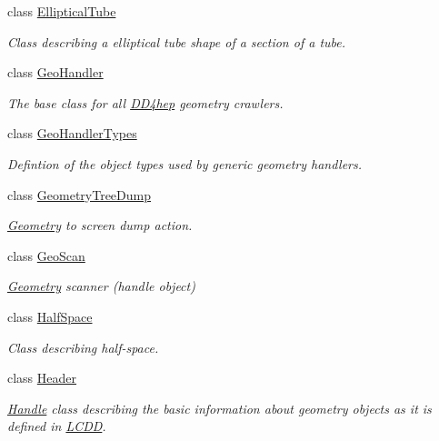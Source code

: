 \begin{DoxyCompactItemize}
class \hyperlink{class_d_d4hep_1_1_geometry_1_1_elliptical_tube}{Elliptical\+Tube}
\begin{DoxyCompactList}\small\item\em Class describing a elliptical tube shape of a section of a tube. \end{DoxyCompactList}\item 
class \hyperlink{class_d_d4hep_1_1_geometry_1_1_geo_handler}{Geo\+Handler}
\begin{DoxyCompactList}\small\item\em The base class for all \hyperlink{namespace_d_d4hep}{D\+D4hep} geometry crawlers. \end{DoxyCompactList}\item 
class \hyperlink{class_d_d4hep_1_1_geometry_1_1_geo_handler_types}{Geo\+Handler\+Types}
\begin{DoxyCompactList}\small\item\em Defintion of the object types used by generic geometry handlers. \end{DoxyCompactList}\item 
class \hyperlink{class_d_d4hep_1_1_geometry_1_1_geometry_tree_dump}{Geometry\+Tree\+Dump}
\begin{DoxyCompactList}\small\item\em \hyperlink{namespace_d_d4hep_1_1_geometry}{Geometry} to screen dump action. \end{DoxyCompactList}\item 
class \hyperlink{class_d_d4hep_1_1_geometry_1_1_geo_scan}{Geo\+Scan}
\begin{DoxyCompactList}\small\item\em \hyperlink{namespace_d_d4hep_1_1_geometry}{Geometry} scanner (handle object) \end{DoxyCompactList}\item 
class \hyperlink{class_d_d4hep_1_1_geometry_1_1_half_space}{Half\+Space}
\begin{DoxyCompactList}\small\item\em Class describing half-\/space. \end{DoxyCompactList}\item 
class \hyperlink{class_d_d4hep_1_1_geometry_1_1_header}{Header}
\begin{DoxyCompactList}\small\item\em \hyperlink{class_d_d4hep_1_1_handle}{Handle} class describing the basic information about geometry objects as it is defined in \hyperlink{class_d_d4hep_1_1_geometry_1_1_l_c_d_d}{L\+C\+DD}. \end{DoxyCompactList}\item 

\end{DoxyCompactItemize}

